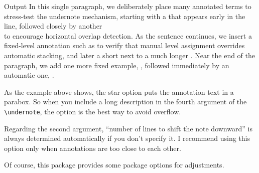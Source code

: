 \documentclass[luatex,fontsize=8pt,paper=b5,twoside]{jlreq}%
\begin{document}
\begin{OutPut}{Output}
  In this single paragraph, we deliberately place many annotated terms to
  stress-test the undernote mechanism, starting with a
  that appears early in the line, followed closely by another\\
   to encourage horizontal overlap detection.
  As the sentence continues, we insert a fixed-level annotation such as
  to verify that manual level assignment overrides automatic stacking,
  and later a short
  next to a much longer
  .
  Near the end of the paragraph, we add one more fixed example,
  ,
  followed immediately by an automatic one,
  .
\end{OutPut}

As the example above shows, the star option puts the annotation text in a parabox. So when you include a long description in the fourth argument of the \verb|\undernote|, the option is the best way to avoid overflow.

Regarding the second argument, ``number of lines to shift the note downward'' is always determined automatically if you don't specify it. I recommend using this option only when annotations are too close to each other.

Of course, this package provides some package options for adjustments.\bigskip
\end{document}
